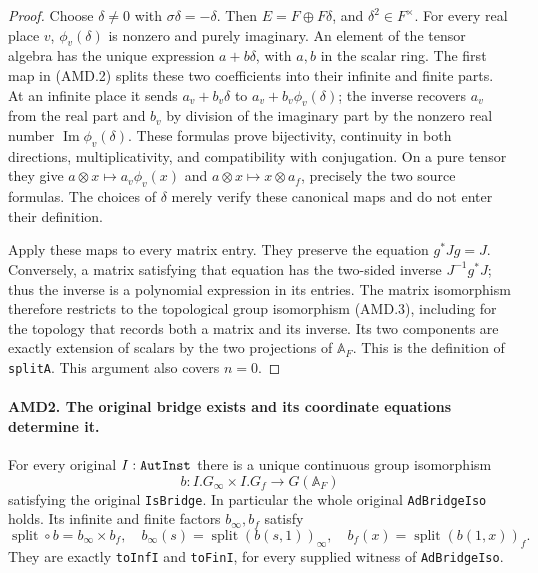 \documentclass[11pt,a4paper]{article}
\numberwithin{equation}{section}
\theoremstyle{remark}\newtheorem{remark}[theorem]{Remark}
\begin{document}
\begin{proof}
Choose \(\delta\ne0\) with \(\sigma\delta=-\delta\).
Then \(E=F\oplus F\delta\), and \(\delta^2\in F^\times\).
For every real place \(v\), \(\phi_v(\delta)\) is nonzero
and purely imaginary.  An element of the tensor algebra has the
unique expression \(a+b\delta\), with \(a,b\) in the scalar
ring.  The first map in (AMD.2) splits these two coefficients into
their infinite and finite parts.  At an infinite place it sends
\(a_v+b_v\delta\) to \(a_v+b_v\phi_v(\delta)\); the inverse
recovers \(a_v\) from the real part and \(b_v\) by division of
the imaginary part by the nonzero real number
\(\operatorname{Im}\phi_v(\delta)\).  These formulas prove
bijectivity, continuity in both directions, multiplicativity, and
compatibility with conjugation.  On a pure tensor they give
\(a\otimes x\mapsto a_v\phi_v(x)\) and
\(a\otimes x\mapsto x\otimes a_f\), precisely the two source
formulas.  The choices of \(\delta\) merely verify these canonical
maps and do not enter their definition.

Apply these maps to every matrix entry.  They preserve the equation
\(g^*Jg=J\).  Conversely, a matrix satisfying that equation has
the two-sided inverse \(J^{-1}g^*J\); thus the inverse is a
polynomial expression in its entries.  The matrix isomorphism
therefore restricts to the topological group isomorphism (AMD.3),
including for the topology that records both a matrix and its
inverse.  Its two components are exactly extension of scalars by
the two projections of \(\mathbb A_F\).  This is the definition
of \texttt{split\allowbreak A}.  This argument also covers \(n=0\).
\end{proof}

\paragraph{AMD2. The original bridge exists and its coordinate equations determine it.}
\label{claim:AMD2}
For every original \(I:\texttt{Aut\allowbreak Inst}\) there is a unique
continuous group isomorphism
\[
 b:I.G_\infty\times I.G_f\longrightarrow
                          G(\mathbb A_F)
 \tag{AMD.4}
\]
satisfying the original \texttt{Is\allowbreak Bridge}.  In particular the
whole original \texttt{Ad\allowbreak Bridge\allowbreak Iso} holds.  Its infinite and
finite factors \(b_\infty,b_f\) satisfy
\[
 \operatorname{split}\circ b=b_\infty\times b_f,
 \quad
 b_\infty(s)=\operatorname{split}(b(s,1))_\infty,
 \quad
 b_f(x)=\operatorname{split}(b(1,x))_f.
 \tag{AMD.5}
\]
They are exactly \texttt{to\allowbreak Inf\allowbreak I} and \texttt{to\allowbreak Fin\allowbreak I}, for every
supplied witness of \texttt{Ad\allowbreak Bridge\allowbreak Iso}.
\end{document}
